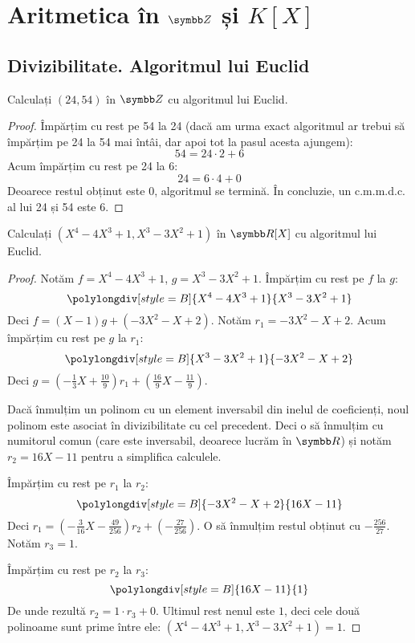 \section{Aritmetica în \texorpdfstring{\(\integers\)}{Z} și \texorpdfstring{\(K[X]\)}{K[X]}}

\subsection{Divizibilitate. Algoritmul lui Euclid}

\begin{exercise}[1.15]
Calculați \((24, 54)\) în \(\integers\) cu algoritmul lui Euclid.
\end{exercise}
\begin{proof}
Împărțim cu rest pe 54 la 24 (dacă am urma exact algoritmul ar trebui să împărțim pe 24 la 54 mai întâi, dar apoi tot la pasul acesta ajungem):
\[
    54 = 24 \cdot 2 + 6
\]
Acum împărțim cu rest pe 24 la 6:
\[
    24 = 6 \cdot 4 + 0
\]
Deoarece restul obținut este 0, algoritmul se termină. În concluzie, un c.m.m.d.c. al lui 24 și 54 este 6.
\end{proof}

\begin{exercise}[1.16]
Calculați \((X^4 - 4X^3 + 1, X^3 - 3X^2 + 1)\) în \(\reals[X]\) cu algoritmul lui Euclid.
\end{exercise}
\begin{proof}
Notăm \(f = X^4 - 4X^3 + 1\), \(g = X^3 - 3X^2 + 1\).
Împărțim cu rest pe \(f\) la \(g\):
\[
\polylongdiv[style=B]{X^4 - 4X^3 + 1}{X^3 - 3X^2 + 1}
\]
Deci \(f = (X - 1) g + (- 3X^2 - X + 2)\). Notăm \(r_1 = -3X^2 - X + 2\). Acum împărțim cu rest pe \(g\) la \(r_1\):
\[
\polylongdiv[style=B]{X^3 - 3X^2 + 1}{-3X^2 - X + 2}
\]
Deci \(g = \left(-\frac{1}{3} X + \frac{10}{9}\right) r_1 + \left(\frac{16}{9} X - \frac{11}{9}\right)\).

Dacă înmulțim un polinom cu un element inversabil din inelul de coeficienți, noul polinom este asociat în divizibilitate cu cel precedent. Deci o să înmulțim cu numitorul comun (care este inversabil, deoarece lucrăm în \(\reals\)) și notăm \(r_2 = 16 X - 11\) pentru a simplifica calculele.

Împărțim cu rest pe \(r_1\) la \(r_2\):
\[
\polylongdiv[style=B]{-3X^2 - X + 2}{16 X - 11}
\]
Deci \(r_1 = \left(-\frac{3}{16} X - \frac{49}{256}\right) r_2 + (-\frac{27}{256})\).
O să înmulțim restul obținut cu \(-\frac{256}{27}\). Notăm \(r_3 = 1\).

Împărțim cu rest pe \(r_2\) la \(r_3\):
\[
\polylongdiv[style=B]{16 X - 11}{1}
\]
De unde rezultă \(r_2 = 1 \cdot r_3 + 0\). Ultimul rest nenul este \(1\), deci cele două polinoame sunt prime între ele: \((X^4 - 4X^3 + 1, X^3 - 3X^2 + 1) = 1\).
\end{proof}


